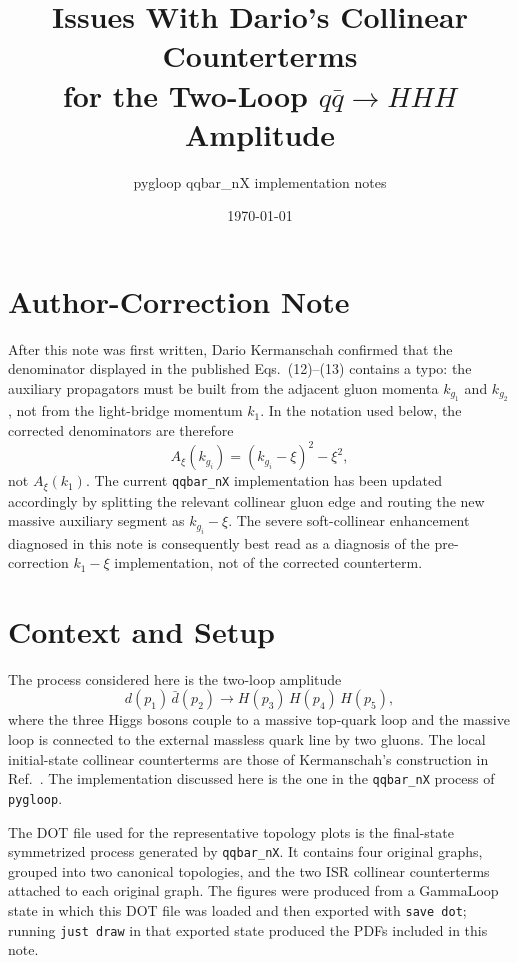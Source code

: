 \documentclass[11pt]{report}
\title{Issues With Dario's Collinear Counterterms\\
for the Two-Loop \(q\bar q\to HHH\) Amplitude}
\author{pygloop qqbar\_nX implementation notes}
\date{\today}
\newcommand{\Axi}{A_\xi}
\begin{document}
\maketitle

\tableofcontents

\chapter*{Author-Correction Note}

After this note was first written, Dario Kermanschah confirmed that the
denominator displayed in the published Eqs.~(12)--(13) contains a typo: the
auxiliary propagators must be built from the adjacent gluon momenta
\(k_{g_1}\) and \(k_{g_2}\), not from the light-bridge momentum \(k_1\).  In
the notation used below, the corrected denominators are therefore
\[
  \Axi(k_{g_i})=(k_{g_i}-\xi)^2-\xi^2,
\]
not \(\Axi(k_1)\).  The current \texttt{qqbar\_nX} implementation has been
updated accordingly by splitting the relevant collinear gluon edge and routing
the new massive auxiliary segment as \(k_{g_i}-\xi\).  The severe
soft-collinear enhancement diagnosed in this note is consequently best read as
a diagnosis of the pre-correction \(k_1-\xi\) implementation, not of the
corrected counterterm.

\chapter{Context and Setup}

The process considered here is the two-loop amplitude
\[
  d(p_1)\,\bar d(p_2)\longrightarrow H(p_3)\,H(p_4)\,H(p_5),
\]
where the three Higgs bosons couple to a massive top-quark loop and the
massive loop is connected to the external massless quark line by two gluons.
The local initial-state collinear counterterms are those of
Kermanschah's construction in Ref.~\cite{Kermanschah:2026}.
The implementation discussed here is the one in the \texttt{qqbar\_nX}
process of \texttt{pygloop}.

The DOT file used for the representative topology plots is the final-state
symmetrized process generated by \texttt{qqbar\_nX}. It contains four original
graphs, grouped into two canonical topologies, and the two ISR collinear
counterterms attached to each original graph. The figures were produced from a
GammaLoop state in which this DOT file was loaded and then exported with
\texttt{save dot}; running \texttt{just draw} in that exported state produced
the PDFs included in this note.
\end{document}
